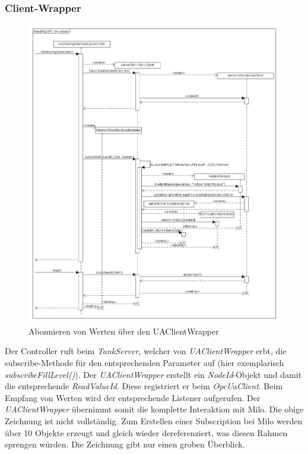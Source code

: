 \documentclass[parskip=full]{scrartcl}
\begin{document}
\subsubsection{Client-Wrapper}
\label{milo-wrapper-diagram}
\begin{figure}[H]
  \centering
  \includegraphics[scale=0.4]{design/sequence-diagrams/sequence-subscribe-client-value.png}
  \caption{Abonnieren von Werten über den UAClientWrapper}
\end{figure}
Der Controller ruft beim \emph{TankServer}, welcher von \emph{UAClientWrapper} erbt, die subscribe-Methode für den entsprechenden Parameter auf
(hier exemplarisch \emph{subscribeFillLevel()}). Der \emph{UAClientWrapper} erstellt ein \emph{NodeId}-Objekt und damit die
entsprechende \emph{ReadValueId}. Diese registriert er beim \emph{OpcUaClient}.
Beim Empfang von Werten wird der entsprechende Listener aufgerufen. Der \emph{UAClientWrapper} übernimmt somit die
komplette Interaktion mit Milo. Die obige Zeichnung ist nicht vollständig. Zum Erstellen einer Subscription bei Milo werden über 10
Objekte erzeugt und gleich wieder dereferenziert, was diesen Rahmen sprengen würden. Die Zeichnung gibt nur einen groben Überblick.
\end{document}
